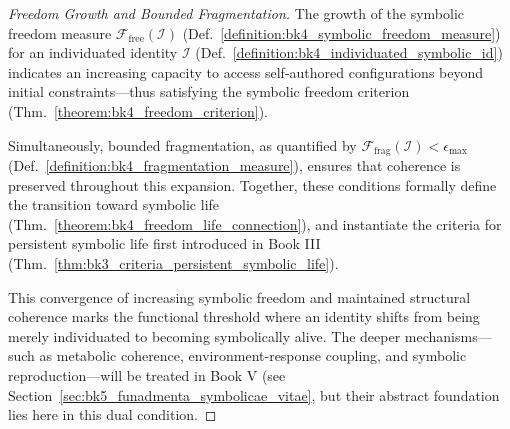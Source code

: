 \begin{proof}[Freedom Growth and Bounded Fragmentation]
\label{proof:bk4_freedom_growth_fragmentation}
The growth of the symbolic freedom measure $\mathcal{F}_{\text{free}}(\mathcal{I})$ (Def.~\ref{definition:bk4_symbolic_freedom_measure}) for an individuated identity $\mathcal{I}$ (Def.~\ref{definition:bk4_individuated_symbolic_id}) indicates an increasing capacity to access self-authored configurations beyond initial constraints—thus satisfying the symbolic freedom criterion (Thm.~\ref{theorem:bk4_freedom_criterion}).

Simultaneously, bounded fragmentation, as quantified by $\mathcal{F}_{\text{frag}}(\mathcal{I}) < \epsilon_{\text{max}}$ (Def.~\ref{definition:bk4_fragmentation_measure}), ensures that coherence is preserved throughout this expansion. Together, these conditions formally define the transition toward symbolic life (Thm.~\ref{theorem:bk4_freedom_life_connection}), and instantiate the criteria for persistent symbolic life first introduced in Book III (Thm.~\ref{thm:bk3_criteria_persistent_symbolic_life}).

This convergence of increasing symbolic freedom and maintained structural coherence marks the functional threshold where an identity shifts from being merely individuated to becoming symbolically alive. The deeper mechanisms—such as metabolic coherence, environment-response coupling, and symbolic reproduction—will be treated in Book V (see Section~\ref{sec:bk5_funadmenta_symbolicae_vitae}, but their abstract foundation lies here in this dual condition.
\end{proof}

